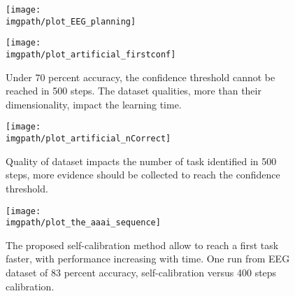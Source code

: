 \begin{figure*}[t]
\centering
\begin{minipage}[t]{.65\columnwidth}
  \centering
          \texttt{[image: \\imgpath/plot\_EEG\_planning]}
          \caption{}
      \label{fig:planning}
\end{minipage}
\begin{minipage}[t]{.65\columnwidth}
  \centering
          \texttt{[image: \\imgpath/plot\_artificial\_firstconf]}
          \caption{Under 70 percent accuracy, the confidence threshold cannot be reached in 500 steps. The dataset qualities, more than their dimensionality, impact the learning time.}
          \label{fig:firstArtificial}
\end{minipage}    
\begin{minipage}[t]{.65\columnwidth}
  \centering
              \texttt{[image: \\imgpath/plot\_artificial\_nCorrect]}
          \caption{Quality of dataset impacts the number of task identified in 500 steps, more evidence should be collected to reach the confidence threshold.}
          \label{fig:nCorrectArtificial}
\end{minipage}
\end{figure*} 

\begin{figure}[t]
\centering
\texttt{[image: \\imgpath/plot\_the\_aaai\_sequence]}
\caption{The proposed self-calibration method allow to reach a first task faster, with performance increasing with time. One run from EEG dataset of 83 percent accuracy, self-calibration versus 400 steps calibration.}
\end{figure} 